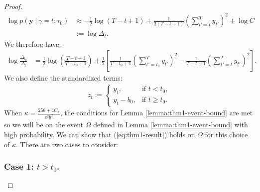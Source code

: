\begin{proof}
\begin{align*}
    \log p(\mathbf{y} \:|\: \gamma = t; \tau_0) &\approx -\frac{1}{2}\log(T - t + 1) + \frac{1}{2(T-t+1)}\left(\sum_{t'=t}^{T} y_{t'}\right)^2 + \log C \\
    &:= \log \Delta_t.
\end{align*}
We therefore have:
\begin{align*}
    \log \frac{\Delta_{t_0}}{\Delta_t} &= \frac{1}{2} \log \left(\frac{T-t+1}{T-t_0+1}\right) + \frac{1}{2} \left[\frac{1}{T-t_0+1}\left(\sum_{t'=t_0}^{T} y_{t'}\right)^2- \frac{1}{T-t+1}\left(\sum_{t'=t}^{T} y_{t'}\right)^2\right].
\end{align*}
We also define the standardized terms:
\begin{align*}
    z_{t} :=
    \begin{cases}
        y_t, & \text{if } t < t_0, \\
        y_t - b_0, & \text{if } t \geq t_0.
    \end{cases}
\end{align*}
When $\kappa = \frac{256 + 4C_\pi}{c^2\underline{b}^2}$, the conditions for Lemma \ref{lemma:thm1-event-bound} are met so we will be on the event $\Omega$ defined in  Lemma \ref{lemma:thm1-event-bound} with high probability. We can show that (\ref{eq:thm1-result}) holds on $\Omega$ for this choice of $\kappa$. There are two cases to consider:

\subsubsection*{Case 1: $t > t_0$.}


\end{proof}
